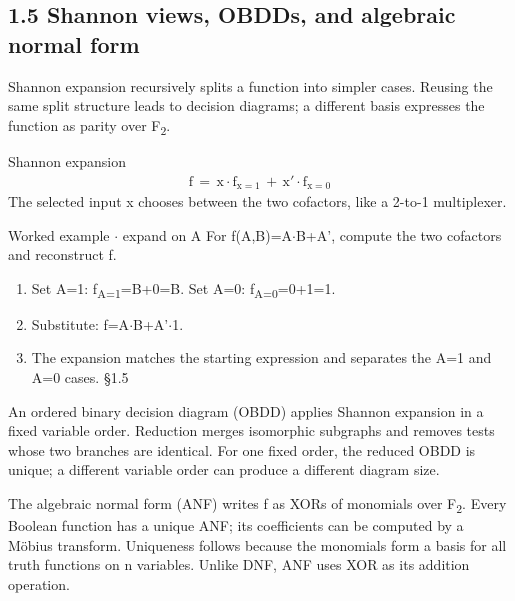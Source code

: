 \documentclass[11pt]{article}
\begin{document}
\begin{keepsection}
\section{1.5 Shannon views, OBDDs, and algebraic normal form}

Shannon expansion recursively splits a function into simpler cases. Reusing the same split structure leads to decision diagrams; a different basis expresses the function as parity over F\textsubscript{2}.

\begin{equationcard}{Shannon expansion}
\[ \begin{gathered} \mathrm{f}\, =\, \mathrm{x}\cdot \mathrm{f}_{\mathrm{x}=1}\, +\, \mathrm{x}'\cdot \mathrm{f}_{\mathrm{x}=0} \end{gathered} \]
{\small The selected input x chooses between the two cofactors, like a 2-to-1 multiplexer.}
\end{equationcard}

\begin{workedbox}{Worked example \ensuremath{\cdot} expand on A}
For f(A,B)=A\ensuremath{\cdot}B+A', compute the two cofactors and reconstruct f.

\begin{enumerate}
\item Set A=1: f\textsubscript{A=1}=B+0=B. Set A=0: f\textsubscript{A=0}=0+1=1.
\item Substitute: f=A\ensuremath{\cdot}B+A'\ensuremath{\cdot}1.
\item The expansion matches the starting expression and separates the A=1 and A=0 cases. \hfill{\small\color{FAUblue}§1.5}
\end{enumerate}
\end{workedbox}

An ordered binary decision diagram (OBDD) applies Shannon expansion in a fixed variable order. Reduction merges isomorphic subgraphs and removes tests whose two branches are identical. For one fixed order, the reduced OBDD is unique; a different variable order can produce a different diagram size.

The algebraic normal form (ANF) writes f as XORs of monomials over F\textsubscript{2}. Every Boolean function has a unique ANF; its coefficients can be computed by a Möbius transform. Uniqueness follows because the monomials form a basis for all truth functions on n variables. Unlike DNF, ANF uses XOR as its addition operation.


\end{keepsection}
\end{document}
